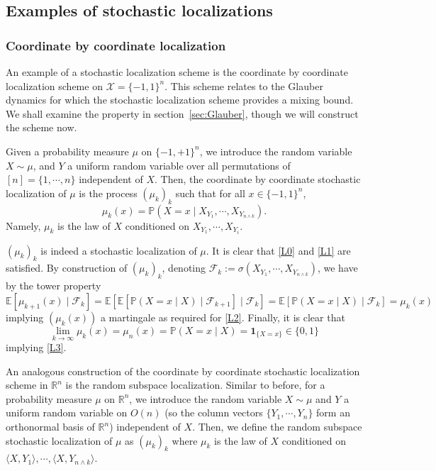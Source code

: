\subsection{Examples of stochastic localizations}

\subsubsection{Coordinate by coordinate localization}

An example of a stochastic localization scheme is the coordinate by coordinate localization scheme 
on \(\mathcal{X} = \{-1, 1\}^n\). This scheme relates to the Glauber dynamics for which the stochastic 
localization scheme provides a mixing bound. We shall examine the property in section~\ref{sec:Glauber}, 
though we will construct the scheme now. 

Given a probability measure \(\mu\) on \(\{-1, +1\}^n\), we introduce the random variable \(X \sim \mu\), and 
\(Y\) a uniform random variable over all permutations of \([n] = \{1, \cdots, n\}\) independent of \(X\). 
Then, the coordinate by coordinate stochastic localization of \(\mu\) is the process \((\mu_k)_{k}\)
such that for all \(x \in \{-1, 1\}^n\),
\[\mu_k(x) = \mathbb{P}(X = x \mid X_{Y_1}, \cdots, X_{Y_{n \wedge k}}).\]
Namely, \(\mu_k\) is the law of \(X\) conditioned on \(X_{Y_1}, \cdots, X_{Y_i}\).

\((\mu_k)_{k}\) is indeed a stochastic localization of \(\mu\). It is clear that \ref{L0} and \ref{L1} are 
satisfied. By construction of \((\mu_k)_k\), denoting 
\(\mathscr{F}_k := \sigma(X_{Y_1}, \cdots, X_{Y_{n \wedge k}})\), we have by the tower property
\[\mathbb{E}[\mu_{k + 1}(x) \mid \mathscr{F}_k] 
  = \mathbb{E}[\mathbb{E}[\mathbb{P}(X = x \mid X) \mid \mathscr{F}_{k + 1}] \mid \mathscr{F}_k]
  = \mathbb{E}[\mathbb{P}(X = x \mid X) \mid \mathscr{F}_k] = \mu_k(x)\]
implying \((\mu_k(x))\) a martingale as required for \ref{L2}. Finally, it is clear that
\[\lim_{k \to \infty} \mu_k(x) = \mu_n(x) = \mathbb{P}(X = x \mid X) = \mathbf{1}_{\{X = x\}} \in \{0, 1\}\]
implying \ref{L3}.

An analogous construction of the coordinate by coordinate stochastic localization scheme in \(\mathbb{R}^n\) 
is the random subspace localization. Similar to before, for a probability measure \(\mu\) on \(\mathbb{R}^n\),
we introduce the random variable \(X \sim \mu\) and \(Y\) a uniform random variable on \(O(n)\) 
(so the column vectors \(\{Y_1, \cdots, Y_n\}\) form an orthonormal basis of \(\mathbb{R}^n\)) 
independent of \(X\). Then, we define the random subspace stochastic localization of \(\mu\) as \((\mu_k)_k\) 
where \(\mu_k\) is the law of \(X\) conditioned on \(\langle X, Y_1\rangle, \cdots, \langle X, Y_{n \wedge k}\rangle\).

